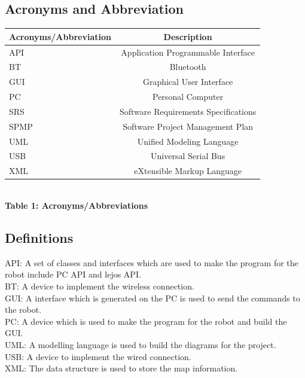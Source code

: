 \documentclass[11pt, a4paper]{report}
\begin{document}
\section{Acronyms and Abbreviation}
\begin{center}
\begin{tabular}{|l|c|}
  \hline
  \textbf{Acronyms/Abbreviation} & \textbf{Description}\\
  \hline
  API		& Application Programmable Interface \\
  \hline
  BT		& Bluetooth \\
  \hline
  GUI		& Graphical User Interface \\
  \hline
  PC		& Personal Computer\\
  \hline
  SRS	& Software Requirements Specifications \\
  \hline
  SPMP 	& Software Project Management Plan \\
  \hline
  UML	& Unified Modeling Language\\
  \hline
  USB	& Universal Serial Bus\\
  \hline
  XML 	& eXtensible Markup Language \\
  \hline
\end{tabular} \\[0.3cm]
\textbf {Table 1: Acronyms/Abbreviations} \\[0.3cm]
\end{center}
\section{Definitions}
\item API: A set of classes and interfaces which are used to make the program for the robot include PC API and lejos API.\\
\newline
\items BT: A device to implement the wireless connection.\\
\newline
\items GUI: A interface which is generated on the PC is used to send the commands to the robot.\\
\newline
\items PC: A device which is used to make the program for the robot and build the GUI.\\
\newline
\items UML: A modelling language is used to build the diagrams for the project.\\
\newline
\items USB: A device to implement the wired connection.\\
\newline
\items XML: The data structure is used to store the map information.\\ 
\pagebreak
\newpage
\appendix

\pagebreak

\chapter{}
\end{document}
